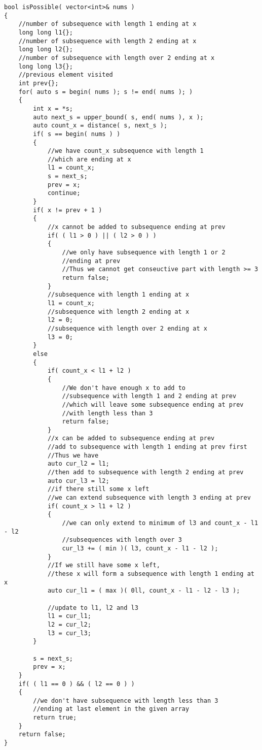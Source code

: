\setcounter{lstlisting}{0}
\begin{lstlisting}[style=customc, caption={Greedy}]
bool isPossible( vector<int>& nums )
{
    //number of subsequence with length 1 ending at x
    long long l1{};
    //number of subsequence with length 2 ending at x
    long long l2{};
    //number of subsequence with length over 2 ending at x
    long long l3{};
    //previous element visited
    int prev{};
    for( auto s = begin( nums ); s != end( nums ); )
    {
        int x = *s;
        auto next_s = upper_bound( s, end( nums ), x );
        auto count_x = distance( s, next_s );
        if( s == begin( nums ) )
        {
            //we have count_x subsequence with length 1
            //which are ending at x
            l1 = count_x;
            s = next_s;
            prev = x;
            continue;
        }
        if( x != prev + 1 )
        {
            //x cannot be added to subsequence ending at prev
            if( ( l1 > 0 ) || ( l2 > 0 ) )
            {
                //we only have subsequence with length 1 or 2
                //ending at prev
                //Thus we cannot get conseuctive part with length >= 3
                return false;
            }
            //subsequence with length 1 ending at x
            l1 = count_x;
            //subsequence with length 2 ending at x
            l2 = 0;
            //subsequence with length over 2 ending at x
            l3 = 0;
        }
        else
        {
            if( count_x < l1 + l2 )
            {
                //We don't have enough x to add to
                //subsequence with length 1 and 2 ending at prev
                //which will leave some subsequence ending at prev
                //with length less than 3
                return false;
            }
            //x can be added to subsequence ending at prev
            //add to subsequence with length 1 ending at prev first
            //Thus we have
            auto cur_l2 = l1;
            //then add to subsequence with length 2 ending at prev
            auto cur_l3 = l2;
            //if there still some x left
            //we can extend subsequence with length 3 ending at prev
            if( count_x > l1 + l2 )
            {
                //we can only extend to minimum of l3 and count_x - l1 - l2
                //subsequences with length over 3
                cur_l3 += ( min )( l3, count_x - l1 - l2 );
            }
            //If we still have some x left,
            //these x will form a subsequence with length 1 ending at x
            auto cur_l1 = ( max )( 0ll, count_x - l1 - l2 - l3 );

            //update to l1, l2 and l3
            l1 = cur_l1;
            l2 = cur_l2;
            l3 = cur_l3;
        }

        s = next_s;
        prev = x;
    }
    if( ( l1 == 0 ) && ( l2 == 0 ) )
    {
        //we don't have subsequence with length less than 3
        //ending at last element in the given array
        return true;
    }
    return false;
}
\end{lstlisting}

